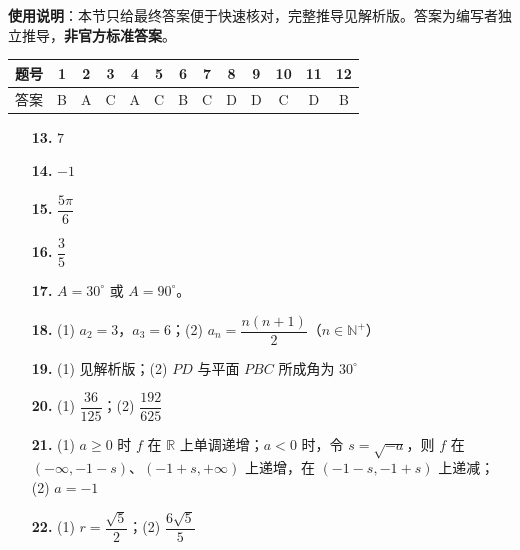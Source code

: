 
\begin{gknotice}
\textbf{使用说明}：本节只给最终答案便于快速核对，完整推导见解析版。答案为编写者独立推导，\textbf{非官方标准答案}。
\end{gknotice}

\begin{center}\begin{tabular}{ccccccccccccc}
\toprule
题号 & 1 & 2 & 3 & 4 & 5 & 6 & 7 & 8 & 9 & 10 & 11 & 12 \\
\midrule
答案 & B & A & C & A & C & B & C & D & D & C & D & B \\
\bottomrule
\end{tabular}\end{center}

\begin{itemize}[leftmargin=2.6em]
  \item[\textbf{13.}] $7$
  \item[\textbf{14.}] $-1$
  \item[\textbf{15.}] $\dfrac{5\pi}{6}$
  \item[\textbf{16.}] $\dfrac35$
\end{itemize}

\begin{itemize}[leftmargin=2.6em]
  \item[\textbf{17.}] $A=30^\circ$ 或 $A=90^\circ$。
  \item[\textbf{18.}] (1) $a_2=3$，$a_3=6$；(2) $a_n=\dfrac{n(n+1)}2$（$n\in\mathbb N^+$）
  \item[\textbf{19.}] (1) 见解析版；(2) $PD$ 与平面 $PBC$ 所成角为 $30^\circ$
  \item[\textbf{20.}] (1) $\dfrac{36}{125}$；(2) $\dfrac{192}{625}$
  \item[\textbf{21.}] (1) $a\geq0$ 时 $f$ 在 $\mathbb R$ 上单调递增；$a<0$ 时，令 $s=\sqrt{-a}$，则 $f$ 在 $(-\infty,-1-s)$、$(-1+s,+\infty)$ 上递增，在 $(-1-s,-1+s)$ 上递减；(2) $a=-1$
  \item[\textbf{22.}] (1) $r=\dfrac{\sqrt5}{2}$；(2) $\dfrac{6\sqrt5}{5}$
\end{itemize}
